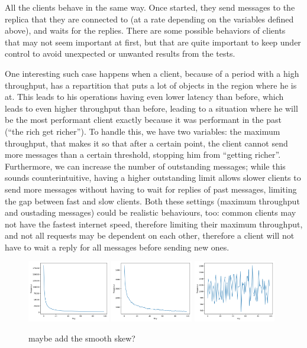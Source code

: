 All the clients behave in the same way. Once started, they send messages to the replica that they are connected to (at a rate depending on the variables defined above), and waits for the replies. There are some possible behaviors of clients that may not seem important at first, but that are quite important to keep under control to avoid unexpected or unwanted results from the tests.

One interesting such case happens when a client, because of a period with a high throughput, has a repartition that puts a lot of objects in the region where he is at. This leads to his operations having even lower latency than before, which leads to even higher throughput than before, leading to a situation where he will be the most performant client exactly because it was performant in the past (``the rich get richer''). To handle this, we have two variables: the maximum throughput, that makes it so that after a certain point, the client cannot send more messages than a certain threshold, stopping him from ``getting richer''. Furthermore, we can increase the number of outstanding messages; while this sounds counterintuitive, having a higher outstanding limit allows slower clients to send more messages without having to wait for replies of past messages, limiting the gap between fast and slow clients. Both these settings (maximum throughput and oustading messages) could be realistic behaviours, too: common clients may not have the fastest internet speed, therefore limiting their maximum throughput, and not all requests may be dependent on each other, therefore a client will not have to wait a reply for all messages before sending new ones.

\begin{figure}[!htb]
  \centering
  \includegraphics[width=0.32\textwidth,height=\textheight,keepaspectratio]{img/skew-alpha1.png}
  \includegraphics[width=0.32\textwidth,height=\textheight,keepaspectratio]{img/skew-alpha05.png}
  \includegraphics[width=0.32\textwidth,height=\textheight,keepaspectratio]{img/skew-alpha0.png}
  \caption[caption]{ maybe add the smooth skew? }
  \label{fig:skews}
\end{figure}

